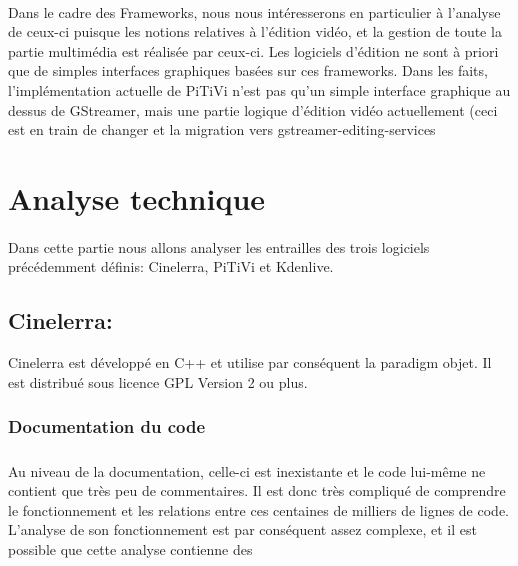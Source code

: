 \paragraph {}

Dans le cadre des Frameworks, nous nous intéresserons en particulier
à l'analyse de ceux-ci puisque les notions relatives à l'édition
vidéo, et la gestion de toute la partie multimédia est réalisée
par ceux-ci. Les logiciels d'édition ne sont à priori que de simples
interfaces graphiques basées sur ces frameworks. Dans les faits,
l'implémentation actuelle de PiTiVi n'est pas qu'un simple interface
graphique au dessus de GStreamer, mais une partie %
logique d'édition vidéo actuellement %
(ceci est en train de changer et la migration \cite{PitviPortToGes}
vers gstreamer-editing-services %

\newpage \section{Analyse technique}

\paragraph {}

Dans cette partie nous allons analyser les entrailles %
des trois logiciels
précédemment définis: Cinelerra, PiTiVi et Kdenlive.

\subsection{Cinelerra:}

Cinelerra est développé en C++ et utilise par conséquent la paradigm
objet.  Il est distribué sous licence GPL Version 2 ou plus.

\subsubsection{Documentation du code}

\subparagraph{}

Au niveau de la documentation, celle-ci est inexistante et le code
lui-même ne contient que très peu de commentaires. Il est donc très
compliqué de comprendre le fonctionnement et les relations entre ces
centaines de milliers de lignes de code. L'analyse de son fonctionnement
est par conséquent assez complexe, et il est possible que cette analyse
contienne des %

